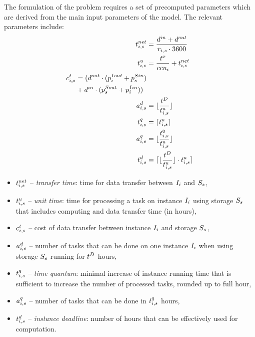 {  The formulation of the problem requires a set of precomputed parameters which are derived from the main input parameters of the model. The relevant  parameters include:
  \begin{align}
      \transferTime_{i,s} &= \frac{\dataSizeIn+\dataSizeOut}{\transferRate_{i,s} \cdot 3600}  \\
      \label{bot:unitTime}\unitTime_{i,s} &= \frac{\execTime}{\ccu_i} + \transferTime_{i,s}  \\
      \begin{split}
          \transferCost_{i,s} &= (\dataSizeOut \cdot
          (\instanceTransferPriceOut_i + \storageTransferPriceIn_s) \\ & +
          \dataSizeIn \cdot (\storageTransferPriceOut_s+\instanceTransferPriceIn_i)) \end{split} \\
      \label{bot:tasksPerDeadline}\tasksPerDeadline_{i,s} &= \lfloor\frac{\deadline}{\unitTime_{i,s}}\rfloor \\
      \timeQuantum_{i,s} &= \lceil \unitTime_{i,s} \rceil \\
      \tasksPerTimeQuantum_{i,s} &= \lfloor\frac{\timeQuantum_{i,s}}{\unitTime_{i,s}}\rfloor \\
      \label{bot:instanceDeadline}\instanceDeadline_{i,s} &= \lceil\lfloor\frac{\deadline}{\unitTime_{i,s}} \rfloor \cdot \unitTime_{i,s} \rceil
  \end{align}
  \begin{itemize}
      \item $t^{net}_{i,s}$ -- {\em transfer time}: time for data transfer between
      $I_i$ and $S_s$,
      \item $t^u_{i,s}$ -- {\em unit time}: time for processing a task
      on instance $I_i$ using storage $S_s$ that includes computing and
      data transfer time (in hours),
      \item $c^t_{i,s}$ -- cost of data transfer between instance
      $I_i$ and storage $S_s$,
      \item $a^d_{i,s}$ -- number of tasks that can be done on
      one instance $I_i$ when using storage $S_s$ running for $t^D$ hours,
      \item $t^q_{i,s}$ -- {\em time quantum}: minimal increase of
      instance running time that is sufficient to increase the number of
      processed tasks, rounded up to full hour,
      \item $a^q_{i,s}$ -- number of tasks that can be done
      in $t^q_{i,s}$ hours,
      \item $t^d_{i,s}$ -- {\em instance deadline}: number of
      hours that can be effectively used for computation.
  \end{itemize}

}
